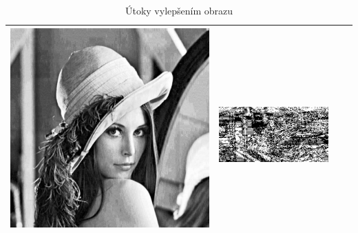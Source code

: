 \begin{table}[h]
\begin{tabular}{llcc}
\begin{minipage}[c]{.1\textwidth}
  \includegraphics[scale=0.1]{obrazky/equalize}
\end{minipage} &
\begin{minipage}[c]{.15\textwidth}
\ 
  \includegraphics[scale=0.25]{obrazky/equalize-wm}
\end{minipage} \\ \hline
\end{tabular}
\caption{Útoky vylepšením obrazu}
\end{table}

\clearpage
